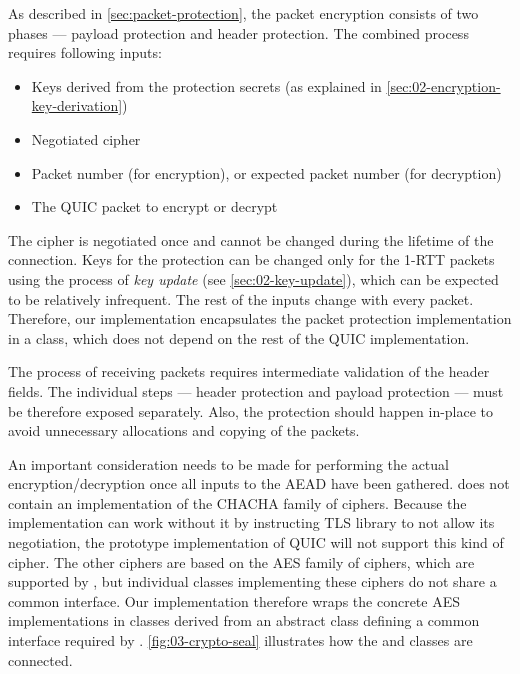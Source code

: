 As described in \autoref{sec:packet-protection}, the packet encryption consists of two phases ---
payload protection and header protection. The combined process requires following inputs:

\begin{itemize}

  \item Keys derived from the protection secrets (as explained in
  \autoref{sec:02-encryption-key-derivation})

  \item Negotiated cipher

  \item Packet number (for encryption), or expected packet number (for decryption)

  \item The QUIC packet to encrypt or decrypt

\end{itemize}

The cipher is negotiated once and cannot be changed during the lifetime of the connection. Keys for
the protection can be changed only for the 1-RTT packets using the process of \textit{key update}
(see \autoref{sec:02-key-update}), which can be expected to be relatively infrequent. The rest of
the inputs change with every packet. Therefore, our implementation encapsulates the packet
protection implementation in a  class, which does not depend on the rest of the
QUIC implementation.

The process of receiving packets requires intermediate validation of the header fields. The
individual steps --- header protection and payload protection --- must be therefore exposed separately.
Also, the protection should happen in-place to avoid unnecessary allocations and copying of the
packets.

An important consideration needs to be made for performing the actual encryption/decryption once all
inputs to the AEAD have been gathered. \dotnet{} does not contain an implementation of the CHACHA
family of ciphers. Because the implementation can work without it by instructing TLS library to not
allow its negotiation, the prototype implementation of QUIC will not support this kind of cipher.
The other ciphers are based on the AES family of ciphers, which are supported by \dotnet{}, but
individual classes implementing these ciphers do not share a common interface. Our implementation
therefore wraps the concrete AES implementations in classes derived from an abstract
 class defining a common interface required by \CryptoSeal{}.
\autoref{fig:03-crypto-seal} illustrates how the \CryptoSeal{} and 
classes are connected.


